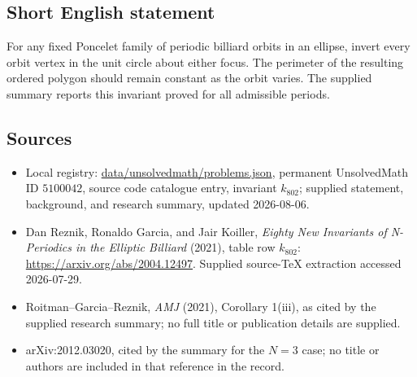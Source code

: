 \documentclass[11pt]{article}
\begin{document}
\subsection{Short English statement}
For any fixed Poncelet family of periodic billiard orbits in an ellipse, invert every orbit vertex in the unit circle about either focus. The perimeter of the resulting ordered polygon should remain constant as the orbit varies. The supplied summary reports this invariant proved for all admissible periods.
\subsection{Sources}
\begin{itemize}
\item Local registry: \url{data/unsolvedmath/problems.json}, permanent UnsolvedMath ID \(5100042\), source code catalogue entry, invariant \(k_{802}\); supplied statement, background, and research summary, updated 2026-08-06.
\item Dan Reznik, Ronaldo Garcia, and Jair Koiller, \emph{Eighty New Invariants of N-Periodics in the Elliptic Billiard} (2021), table row \(k_{802}\): \url{https://arxiv.org/abs/2004.12497}. Supplied source-TeX extraction accessed 2026-07-29.
\item Roitman--Garcia--Reznik, \emph{AMJ} (2021), Corollary 1(iii), as cited by the supplied research summary; no full title or publication details are supplied.
\item arXiv:2012.03020, cited by the summary for the \(N=3\) case; no title or authors are included in that reference in the record.
\end{itemize}
\end{document}
